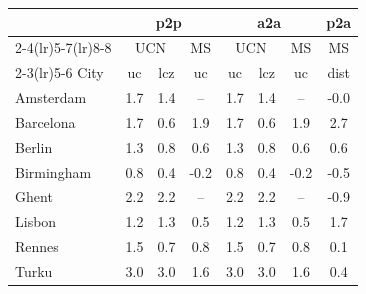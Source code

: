 \begin{table}[t]
\centering
\small
\begin{tabular}{lccc ccc c}
\toprule
& \multicolumn{3}{c}{p2p} & \multicolumn{3}{c}{a2a} & p2a \\
\cmidrule(lr){2-4}\cmidrule(lr){5-7}\cmidrule(lr){8-8}
& \multicolumn{2}{c}{UCN} & MS & \multicolumn{2}{c}{UCN} & MS & MS \\
\cmidrule(lr){2-3}\cmidrule(lr){5-6}
City & uc & lcz & uc & uc & lcz & uc & dist \\
\midrule
Amsterdam & \cellcolor[RGB]{252,100,48}1.7 & \cellcolor[RGB]{253,147,62}1.4 & \cellcolor[RGB]{255,255,204}-- & \cellcolor[RGB]{252,100,48}1.7 & \cellcolor[RGB]{253,147,62}1.4 & \cellcolor[RGB]{255,255,204}-- & \cellcolor[RGB]{255,255,204}-0.0 \\
Barcelona & \cellcolor[RGB]{252,110,51}1.7 & \cellcolor[RGB]{254,225,134}0.6 & \cellcolor[RGB]{252,80,42}1.9 & \cellcolor[RGB]{252,110,51}1.7 & \cellcolor[RGB]{254,225,134}0.6 & \cellcolor[RGB]{252,80,42}1.9 & \cellcolor[RGB]{172,0,38}2.7 \\
Berlin & \cellcolor[RGB]{253,164,70}1.3 & \cellcolor[RGB]{254,209,109}0.8 & \cellcolor[RGB]{254,222,129}0.6 & \cellcolor[RGB]{253,164,70}1.3 & \cellcolor[RGB]{254,209,109}0.8 & \cellcolor[RGB]{254,222,129}0.6 & \cellcolor[RGB]{254,222,129}0.6 \\
Birmingham & \cellcolor[RGB]{254,210,111}0.8 & \cellcolor[RGB]{255,237,161}0.4 & \cellcolor[RGB]{255,255,204}-0.2 & \cellcolor[RGB]{254,210,111}0.8 & \cellcolor[RGB]{255,237,161}0.4 & \cellcolor[RGB]{255,255,204}-0.2 & \cellcolor[RGB]{255,255,204}-0.5 \\
Ghent & \cellcolor[RGB]{229,31,29}2.2 & \cellcolor[RGB]{229,31,29}2.2 & \cellcolor[RGB]{255,255,204}-- & \cellcolor[RGB]{229,31,29}2.2 & \cellcolor[RGB]{229,31,29}2.2 & \cellcolor[RGB]{255,255,204}-- & \cellcolor[RGB]{255,255,204}-0.9 \\
Lisbon & \cellcolor[RGB]{253,168,71}1.2 & \cellcolor[RGB]{253,164,70}1.3 & \cellcolor[RGB]{254,230,146}0.5 & \cellcolor[RGB]{253,168,71}1.2 & \cellcolor[RGB]{253,164,70}1.3 & \cellcolor[RGB]{254,230,146}0.5 & \cellcolor[RGB]{252,100,48}1.7 \\
Rennes & \cellcolor[RGB]{252,136,58}1.5 & \cellcolor[RGB]{254,218,120}0.7 & \cellcolor[RGB]{254,208,108}0.8 & \cellcolor[RGB]{252,136,58}1.5 & \cellcolor[RGB]{254,218,120}0.7 & \cellcolor[RGB]{254,208,108}0.8 & \cellcolor[RGB]{255,252,197}0.1 \\
Turku & \cellcolor[RGB]{133,0,38}3.0 & \cellcolor[RGB]{133,0,38}3.0 & \cellcolor[RGB]{252,118,53}1.6 & \cellcolor[RGB]{255,255,204}3.0 & \cellcolor[RGB]{255,255,204}3.0 & \cellcolor[RGB]{255,255,204}1.6 & \cellcolor[RGB]{254,233,151}0.4 \\

\end{tabular}
\end{table}
